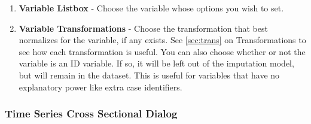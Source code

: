 \documentclass[12pt,titlepage]{article}
\begin{document}
\begin{enumerate}
\item \textbf{Variable Listbox} - Choose the variable whose options
  you wish to set.
\item \textbf{Variable Transformations} - Choose the transformation
  that best normalizes for the variable, if any exists.  See
  \ref{sec:trans} on Transformations to see how each transformation is
  useful.  You can also choose whether or not the variable is an ID
  variable.  If so, it will be left out of the imputation model, but
  will remain in the dataset.  This is useful for variables that have
  no explanatory power like extra case identifiers.
\end{enumerate}


\subsubsection{Time Series Cross Sectional Dialog}
\label{sec:tscsdiag}
\end{document}
